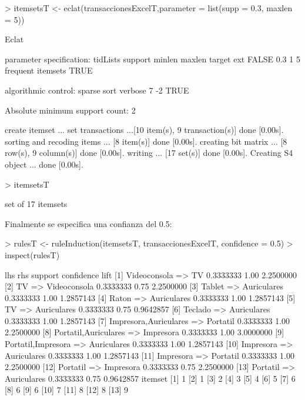 \documentclass [a4paper] {article}
\begin{document}
\begin{Schunk}
\begin{Sinput}
> itemsetsT <- eclat(transaccionesExcelT,parameter = list(supp = 0.3, maxlen = 5))
\end{Sinput}
\begin{Soutput}
Eclat

parameter specification:
 tidLists support minlen maxlen            target  ext
    FALSE     0.3      1      5 frequent itemsets TRUE

algorithmic control:
 sparse sort verbose
      7   -2    TRUE

Absolute minimum support count: 2 

create itemset ... 
set transactions ...[10 item(s), 9 transaction(s)] done [0.00s].
sorting and recoding items ... [8 item(s)] done [0.00s].
creating bit matrix ... [8 row(s), 9 column(s)] done [0.00s].
writing  ... [17 set(s)] done [0.00s].
Creating S4 object  ... done [0.00s].
\end{Soutput}
\begin{Sinput}
> itemsetsT
\end{Sinput}
\begin{Soutput}
set of 17 itemsets 
\end{Soutput}
\end{Schunk}

Finalmente se especifica una confianza del 0.5:
\begin{Schunk}
\begin{Sinput}
> rulesT <- ruleInduction(itemsetsT, transaccionesExcelT, confidence = 0.5)
> inspect(rulesT)
\end{Sinput}
\begin{Soutput}
     lhs                        rhs            support   confidence lift     
[1]  {Videoconsola}          => {TV}           0.3333333 1.00       2.2500000
[2]  {TV}                    => {Videoconsola} 0.3333333 0.75       2.2500000
[3]  {Tablet}                => {Auriculares}  0.3333333 1.00       1.2857143
[4]  {Raton}                 => {Auriculares}  0.3333333 1.00       1.2857143
[5]  {TV}                    => {Auriculares}  0.3333333 0.75       0.9642857
[6]  {Teclado}               => {Auriculares}  0.3333333 1.00       1.2857143
[7]  {Impresora,Auriculares} => {Portatil}     0.3333333 1.00       2.2500000
[8]  {Portatil,Auriculares}  => {Impresora}    0.3333333 1.00       3.0000000
[9]  {Portatil,Impresora}    => {Auriculares}  0.3333333 1.00       1.2857143
[10] {Impresora}             => {Auriculares}  0.3333333 1.00       1.2857143
[11] {Impresora}             => {Portatil}     0.3333333 1.00       2.2500000
[12] {Portatil}              => {Impresora}    0.3333333 0.75       2.2500000
[13] {Portatil}              => {Auriculares}  0.3333333 0.75       0.9642857
     itemset
[1]  1      
[2]  1      
[3]  2      
[4]  3      
[5]  4      
[6]  5      
[7]  6      
[8]  6      
[9]  6      
[10] 7      
[11] 8      
[12] 8      
[13] 9      
\end{Soutput}
\end{Schunk}
\end{document}
